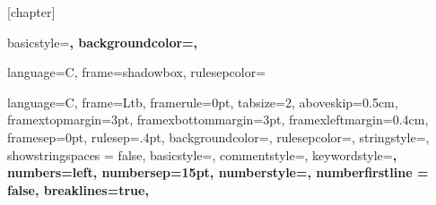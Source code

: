 \makeatletter
\newcommand*{\cleartoleftpage}{%
  \clearpage
  \if@twoside
    \ifodd\c@page
      \hbox{}\newpage
      \if@twocolumn
        \hbox{}\newpage
      \fi
    \fi
  \fi
}
\makeatother

% 
\usepackage{float}
[chapter]


{
  basicstyle=\scriptsize\bf\ttfamily,
  backgroundcolor=\color{gray75},
}

{
  language=C,
  frame=shadowbox, 
  rulesepcolor=\color{blue}
}

{
  language=C,
  frame=Ltb,
  framerule=0pt,
  tabsize=2,
  aboveskip=0.5cm,
  framextopmargin=3pt,
  framexbottommargin=3pt,
  framexleftmargin=0.4cm,
  framesep=0pt,
  rulesep=.4pt,
  backgroundcolor=\color{gray97},
  rulesepcolor=\color{black},
  stringstyle=\ttfamily,
  showstringspaces = false,
  basicstyle=\footnotesize\ttfamily,
  commentstyle=\color{gray45},
  keywordstyle=\bfseries,
  numbers=left,
  numbersep=15pt,
  numberstyle=\tiny,
  numberfirstline = false,
  breaklines=true,
}	

